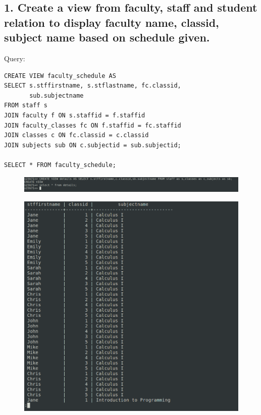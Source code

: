 \documentclass{article}
\begin{document}
\subsection*{1. Create a view from faculty, staff and student relation to display faculty name, classid, subject name based on schedule given.}
Query:
\begin{Verbatim}[frame=single,framerule=1pt,fontfamily=courier,fontsize=\small]
CREATE VIEW faculty_schedule AS
SELECT s.stffirstname, s.stflastname, fc.classid, 
       sub.subjectname
FROM staff s
JOIN faculty f ON s.staffid = f.staffid
JOIN faculty_classes fc ON f.staffid = fc.staffid
JOIN classes c ON fc.classid = c.classid
JOIN subjects sub ON c.subjectid = sub.subjectid;

SELECT * FROM faculty_schedule;
\end{Verbatim}
\begin{figure}[H]
    \centering
    \includegraphics[width=\textwidth]{cycle5/5_1_1.png}
\end{figure}
\begin{figure}[H]
    \centering
    \includegraphics[width=\textwidth]{cycle5/5_1_2.png}
\end{figure}
\end{document}
